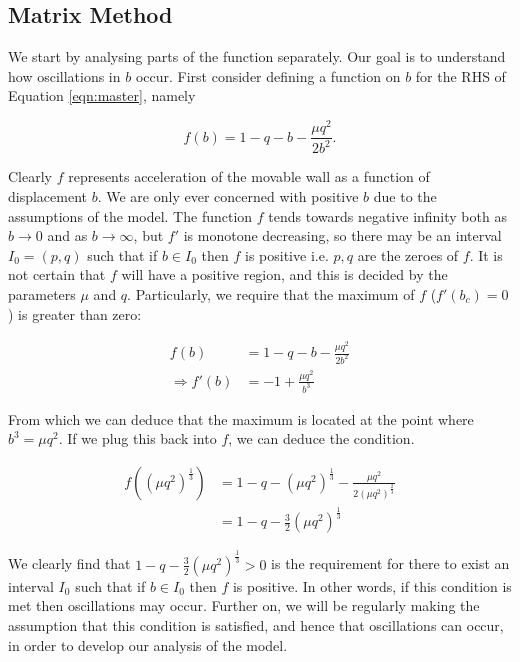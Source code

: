 \documentclass{article}
\begin{document}
\subsection{Matrix Method}

We start by analysing parts of the function separately.
Our goal is to understand how oscillations in $b$ occur.
First consider defining a function on $b$ for the RHS of Equation \ref{eqn:master},
namely

\begin{equation}
    f(b) = 1 - q - b - \frac{\mu q^2}{2b^2}.
\end{equation}

Clearly $f$ represents acceleration of the movable wall as a function of displacement $b$.
We are only ever concerned with positive $b$ due to the assumptions of the model.
The function $f$ tends towards negative infinity both as $b\rightarrow 0$ and as $b\rightarrow\infty$,
but $f'$ is monotone decreasing, so there may be an interval $I_0=(p,q)$ such that if $b\in I_0$
then $f$ is positive i.e. $p,q$ are the zeroes of $f$.
It is not certain that $f$ will have a positive region,
and this is decided by the parameters $\mu$ and $q$.
Particularly, we require that the maximum of $f$ ($f'(b_c) = 0$) is greater than zero:


\begin{align}
    f(b) &= 1 - q - b - \frac{\mu q^2}{2b^2} \\
    \Rightarrow f'(b) &= -1 + \frac{\mu q^2}{b^3}
\end{align}

From which we can deduce that the maximum is located at the point where $b^3 = \mu q^2$.
If we plug this back into $f$, we can deduce the condition.

\begin{align*}
    f((\mu q^2)^{\frac{1}{3}}) &= 1 - q - (\mu q^2)^{\frac{1}{3}} - \frac{\mu q^2}{2(\mu q^2)^{\frac{2}{3}}} \\
    &= 1 - q - \frac{3}{2}(\mu q^2)^{\frac{1}{3}}
\end{align*}

We clearly find that $1 - q - \frac{3}{2}(\mu q^2)^{\frac{1}{3}} > 0$ is the requirement for there to exist an interval $I_0$
such that if $b\in I_0$ then $f$ is positive.
In other words, if this condition is met then oscillations may occur.
Further on, we will be regularly making the assumption that this condition is satisfied,
and hence that oscillations can occur,
in order to develop our analysis of the model.
\end{document}
